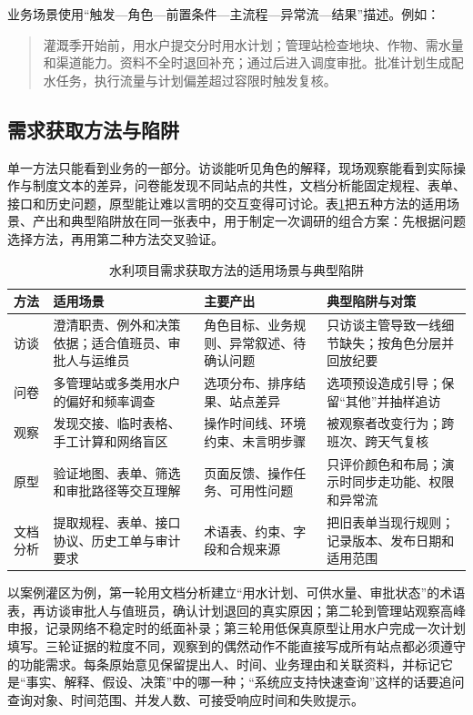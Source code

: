 业务场景使用“触发—角色—前置条件—主流程—异常流—结果”描述。例如：

\begin{quote}
灌溉季开始前，用水户提交分时用水计划；管理站检查地块、作物、需水量和渠道能力。资料不全时退回补充；通过后进入调度审批。批准计划生成配水任务，执行流量与计划偏差超过容限时触发复核。
\end{quote}

\subsection{需求获取方法与陷阱}

单一方法只能看到业务的一部分。访谈能听见角色的解释，现场观察能看到实际操作与制度文本的差异，问卷能发现不同站点的共性，文档分析能固定规程、表单、接口和历史问题，原型能让难以言明的交互变得可讨论。表\ref{tab:ch02-elicitation-methods}把五种方法的适用场景、产出和典型陷阱放在同一张表中，用于制定一次调研的组合方案：先根据问题选择方法，再用第二种方法交叉验证。

\begin{table}[htbp]
\centering
\caption{水利项目需求获取方法的适用场景与典型陷阱}
\label{tab:ch02-elicitation-methods}
\begin{tabular}{p{2.2cm}p{3.5cm}p{3.5cm}p{3.2cm}}
\toprule
方法 & 适用场景 & 主要产出 & 典型陷阱与对策 \\
\midrule
访谈 & 澄清职责、例外和决策依据；适合值班员、审批人与运维员 & 角色目标、业务规则、异常叙述、待确认问题 & 只访谈主管导致一线细节缺失；按角色分层并回放纪要 \\
问卷 & 多管理站或多类用水户的偏好和频率调查 & 选项分布、排序结果、站点差异 & 选项预设造成引导；保留“其他”并抽样追访 \\
观察 & 发现交接、临时表格、手工计算和网络盲区 & 操作时间线、环境约束、未言明步骤 & 被观察者改变行为；跨班次、跨天气复核 \\
原型 & 验证地图、表单、筛选和审批路径等交互理解 & 页面反馈、操作任务、可用性问题 & 只评价颜色和布局；演示时同步走功能、权限和异常流 \\
文档分析 & 提取规程、表单、接口协议、历史工单与审计要求 & 术语表、约束、字段和合规来源 & 把旧表单当现行规则；记录版本、发布日期和适用范围 \\
\bottomrule
\end{tabular}
\end{table}

以案例灌区为例，第一轮用文档分析建立“用水计划、可供水量、审批状态”的术语表，再访谈审批人与值班员，确认计划退回的真实原因；第二轮到管理站观察高峰申报，记录网络不稳定时的纸面补录；第三轮用低保真原型让用水户完成一次计划填写。三轮证据的粒度不同，观察到的偶然动作不能直接写成所有站点都必须遵守的功能需求。每条原始意见保留提出人、时间、业务理由和关联资料，并标记它是“事实、解释、假设、决策”中的哪一种；“系统应支持快速查询”这样的话要追问查询对象、时间范围、并发人数、可接受响应时间和失败提示。

